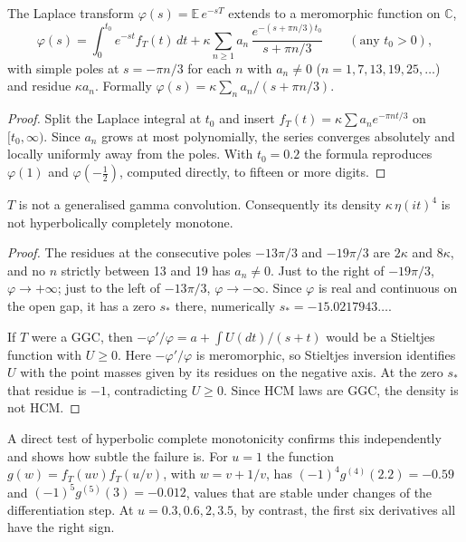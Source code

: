 \begin{lemma}\label{perc:lem:lap}
The Laplace transform $\varphi(s) = \mathbb{E}\,e^{-sT}$ extends to a meromorphic function on $\mathbb{C}$,
\[
\varphi(s) = \int_0^{t_0}e^{-st}f_T(t)\,dt+\kappa\sum_{n\ge1}a_n\,\frac{e^{-(s+\pi n/3)t_0}}{s+\pi n/3}
\qquad(\text{any }t_0>0),
\]
with simple poles at $s = -\pi n/3$ for each $n$ with $a_n\ne0$ ($n = 1,7,13,19,25,\dots$) and residue $\kappa a_n$. Formally $\varphi(s) = \kappa\sum_na_n/(s+\pi n/3)$.
\end{lemma}
\begin{proof}
Split the Laplace integral at $t_0$ and insert $f_T(t) = \kappa\sum a_ne^{-\pi nt/3}$ on $[t_0,\infty)$. Since $a_n$ grows at most polynomially, the series converges absolutely and locally uniformly away from the poles. With $t_0 = 0.2$ the formula reproduces $\varphi(1)$ and $\varphi(-\tfrac12)$, computed directly, to fifteen or more digits.
\end{proof}

\begin{theorem}\label{perc:thm:notggc}
$T$ is not a generalised gamma convolution. Consequently its density $\kappa\,\eta(it)^4$ is not hyperbolically completely monotone.
\end{theorem}
\begin{proof}
The residues at the consecutive poles $-13\pi/3$ and $-19\pi/3$ are $2\kappa$ and $8\kappa$, and no $n$ strictly between 13 and 19 has $a_n\ne0$. Just to the right of $-19\pi/3$, $\varphi\to+\infty$; just to the left of $-13\pi/3$, $\varphi\to-\infty$. Since $\varphi$ is real and continuous on the open gap, it has a zero $s_*$ there, numerically $s_* = -15.0217943\ldots$.

If $T$ were a GGC, then $-\varphi'/\varphi = a+\int U(dt)/(s+t)$ would be a Stieltjes function with $U\ge0$. Here $-\varphi'/\varphi$ is meromorphic, so Stieltjes inversion identifies $U$ with the point masses given by its residues on the negative axis. At the zero $s_*$ that residue is $-1$, contradicting $U\ge0$. Since HCM laws are GGC, the density is not HCM.
\end{proof}

A direct test of hyperbolic complete monotonicity confirms this independently and shows how subtle the failure is. For $u = 1$ the function $g(w) = f_T(uv)f_T(u/v)$, with $w = v+1/v$, has $(-1)^4g^{(4)}(2.2) = -0.59$ and $(-1)^5g^{(5)}(3) = -0.012$, values that are stable under changes of the differentiation step. At $u = 0.3,0.6,2,3.5$, by contrast, the first six derivatives all have the right sign.

